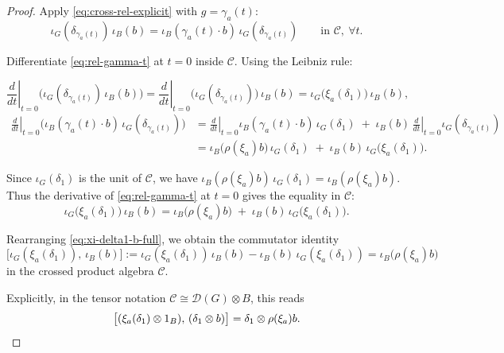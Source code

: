 \documentclass[12pt]{article}
\begin{document}
\begin{proof}

Apply \eqref{eq:cross-rel-explicit} with $g=\gamma_a(t)$:
\begin{equation}\label{eq:rel-gamma-t}
\iota_G(\delta_{\gamma_a(t)})\,\iota_B(b)
=
\iota_B(\gamma_a(t)\cdot b)\,\iota_G(\delta_{\gamma_a(t)})
\qquad\text{in }\mathcal C,\ \forall t.
\end{equation}

Differentiate \eqref{eq:rel-gamma-t} at $t=0$ inside $\mathcal C$.
Using the Leibniz rule:

\[
\left.\frac{d}{dt}\right|_{t=0}
\bigl(\iota_G(\delta_{\gamma_a(t)})\,\iota_B(b)\bigr)
=
\left.\frac{d}{dt}\right|_{t=0}
\bigl(\iota_G(\delta_{\gamma_a(t)})\bigr)\,\iota_B(b)
=
\iota_G\bigl(\xi_a(\delta_1)\bigr)\,\iota_B(b),
\]
\[
\begin{aligned}
\left.\frac{d}{dt}\right|_{t=0}
\bigl(\iota_B(\gamma_a(t)\cdot b)\,\iota_G(\delta_{\gamma_a(t)})\bigr)
&=
\left.\frac{d}{dt}\right|_{t=0}\iota_B(\gamma_a(t)\cdot b)\,\iota_G(\delta_1)
\;+\;
\iota_B(b)\,\left.\frac{d}{dt}\right|_{t=0}\iota_G(\delta_{\gamma_a(t)})\\[4pt]
&=
\iota_B\bigl(\rho(\xi_a)b\bigr)\,\iota_G(\delta_1)
\;+\;
\iota_B(b)\,\iota_G\bigl(\xi_a(\delta_1)\bigr).
\end{aligned}
\]

Since $\iota_G(\delta_1)$ is the unit of $\mathcal C$, we have
$\iota_B(\rho(\xi_a)b)\,\iota_G(\delta_1)=\iota_B(\rho(\xi_a)b)$.  Thus
the derivative of \eqref{eq:rel-gamma-t} at $t=0$ gives the equality
in $\mathcal C$:
\begin{equation}\label{eq:xi-delta1-b-full}
\iota_G\bigl(\xi_a(\delta_1)\bigr)\,\iota_B(b)
=
\iota_B\bigl(\rho(\xi_a)b\bigr)
\;+\;
\iota_B(b)\,\iota_G\bigl(\xi_a(\delta_1)\bigr).
\end{equation}

Rearranging \eqref{eq:xi-delta1-b-full}, we obtain the commutator identity
\begin{equation}\label{eq:xi-delta1-comm-full}
\bigl[\iota_G(\xi_a(\delta_1)),\,\iota_B(b)\bigr]
:=
\iota_G(\xi_a(\delta_1))\,\iota_B(b)
-
\iota_B(b)\,\iota_G(\xi_a(\delta_1))
=
\iota_B\bigl(\rho(\xi_a)b\bigr)
\end{equation}
in the crossed product algebra $\mathcal C$.

Explicitly, in the tensor notation $\mathcal C\cong\mathcal D(G)\otimes B$,
this reads
\[
\bigl[(\xi_a(\delta_1)\otimes 1_B),\,(\delta_1\otimes b)\bigr]
=
\delta_1\otimes \rho(\xi_a)b. \qedhere
\] 
\end{proof}
\end{document}

